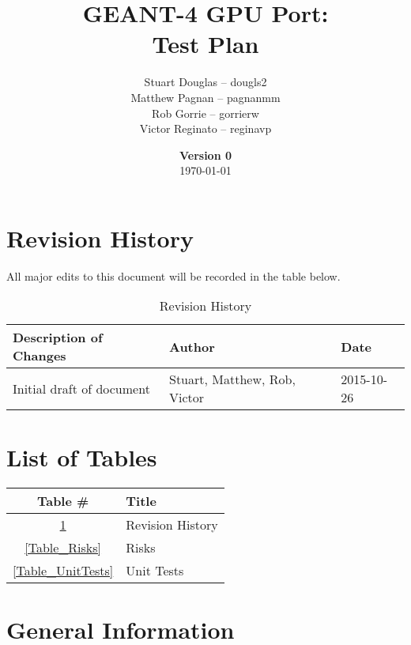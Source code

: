 \documentclass[12pt]{article}
\title{
\LARGE GEANT-4 GPU Port:
\\\vspace{10mm}
\large \textbf{Test Plan}
\vspace{40mm}
}
\author{
Stuart Douglas -- dougls2
\\Matthew Pagnan -- pagnanmm
\\Rob Gorrie -- gorrierw
\\Victor Reginato -- reginavp
\vspace{10mm}
}
\date{\vfill \textbf{Version 0}\\ \today}
\begin{document}

\maketitle
\newpage

\tableofcontents
\newpage
{}
\restoregeometry


\section*{Revision History}
All major edits to this document will be recorded in the table below.

\begin{table}[h]
\centering
\caption{Revision History}\label{Table_Revision}
\begin{tabular}{lll}
\toprule
\bf Description of Changes & \bf Author & \bf Date\\\midrule
Initial draft of document & Stuart, Matthew, Rob, Victor & 2015-10-26\\
\bottomrule
\end{tabular}
\end{table}

\section*{List of Tables}

\begin{center}
\begin{tabular}{cl}
\toprule
\bf Table \# & \bf Title\\\midrule
\ref{Table_Revision} & Revision History\\
\ref{Table_Risks} & Risks\\
\ref{Table_UnitTests} & Unit Tests\\
\bottomrule
\end{tabular}
\end{center}

\section{General Information}
\end{document}
